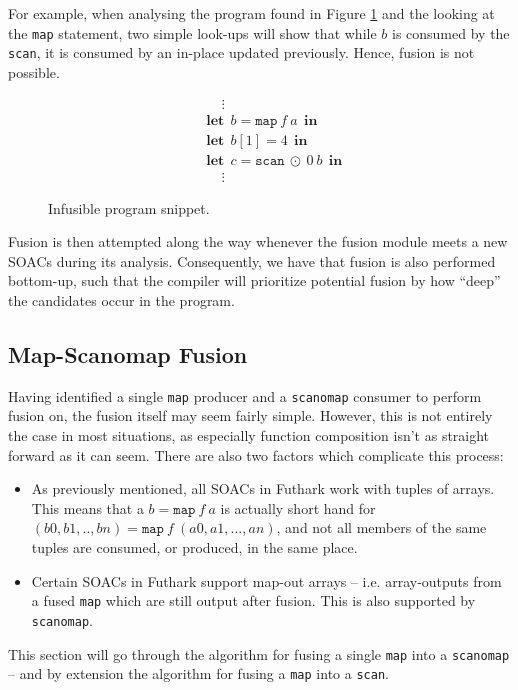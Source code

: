 \documentclass[11pt]{article}
\newcommand\lett{\phantom{-}\:\:\mathbf{let}\:\:}
\newcommand\inn{\:\:\mathbf{in}\:\:}
\begin{document}
For example, when analysing the program found in Figure \ref{fig:progsnip1} and the looking at the \texttt{map} statement, two simple look-ups will show that while $b$ is consumed by the
 \texttt{scan}, it is consumed by an in-place updated previously. Hence, fusion is not possible.
\begin{figure}[hb!]
  \centering
  \begin{mdframed}[style=alignbox]
  \begin{align*}
    &\phantom{---}\vdots\\
    &\lett b = \mathtt{map} \: f \: a \inn\\
    &\lett b[1] = 4 \inn\\
    &\lett c = \mathtt{scan} \: \odot \: 0 \: b \inn\\
    &\phantom{---}\vdots
  \end{align*}
\end{mdframed}

  \caption{Infusible program snippet.}
  \label{fig:progsnip1}
\end{figure}

Fusion is then attempted along the way whenever the fusion module meets a new SOACs during its analysis. Consequently, we have that fusion is also performed bottom-up, such that
 the compiler will prioritize potential fusion by how ``deep'' the candidates occur in the program.
\subsection{Map-Scanomap Fusion}
\setcounter{equation}{0}
Having identified a single \texttt{map} producer and a \texttt{scanomap} consumer to perform fusion on, the fusion itself may seem fairly simple.
 However, this is not entirely the case in most situations, as especially function composition isn't as straight forward as it can seem. There are also two factors
 which complicate this process:
 \begin{itemize}
 \item As previously mentioned, all SOACs in Futhark work with tuples of arrays. This means that a $b = \mathtt{map}\: f \: a$ is actually short hand for
$(b0, b1, .. ,bn) = \mathtt{map} \: f \: (a0, a1, ..., an)$, and not all members of the same tuples are consumed, or produced, in the same place.
 \item Certain SOACs in Futhark support map-out arrays -- i.e. array-outputs from a fused \texttt{map} which are still output after fusion. This is also
 supported by \texttt{scanomap}. 
 \end{itemize}
This section will go through the algorithm for fusing a single \texttt{map} into a \texttt{scanomap} -- and by extension the algorithm for fusing a \texttt{map} into a \texttt{scan}.
\end{document}
